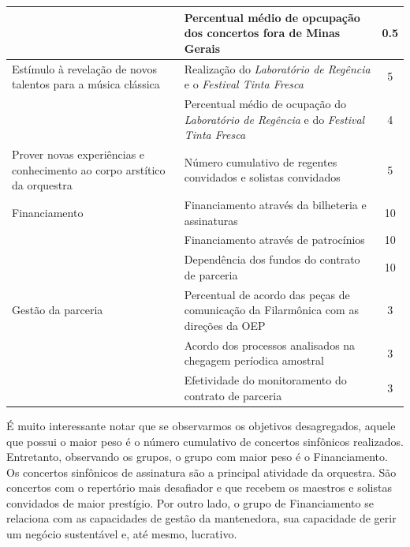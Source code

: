 \documentclass[a4paper, 12pt, openright, oneside, german, french, english, brazil]{abntex2}
\begin{document}
\begin{table}[!h]
{\begin{tabular}{p{6cm} p{7cm} c}
				& Percentual médio de opcupação dos concertos fora de Minas Gerais & 0.5 \\
				\hline
				Estímulo à revelação de novos talentos para a música clássica & Realização do \textit{Laboratório de Regência} e o \textit{Festival Tinta Fresca} & 5 \\
				& Percentual médio de ocupação do \textit{Laboratório de Regência} e do \textit{Festival Tinta Fresca} & 4 \\
				\hline
				Prover novas experiências e conhecimento ao corpo arstítico da orquestra & Número cumulativo de regentes convidados e solistas convidados & 5 \\
				\hline
				Financiamento & Financiamento através da bilheteria e assinaturas & 10 \\
				& Financiamento através de patrocínios & 10 \\
				& Dependência dos fundos do contrato de parceria & 10 \\
				\hline
				Gestão da parceria & Percentual de acordo das peças de comunicação da Filarmônica com as direções da OEP & 3 \\
				& Acordo dos processos analisados na chegagem períodica amostral & 3 \\
				& Efetividade do monitoramento do contrato de parceria & 3 \\
				\hline
				
			\end{tabular}
		}
		{}
	\end{table}
	
	
	
	É muito interessante notar que se observarmos os objetivos desagregados, aquele que possui o maior peso é o número cumulativo de concertos sinfônicos realizados. Entretanto, observando os grupos, o grupo com maior peso é o Financiamento. Os concertos sinfônicos de assinatura são a principal atividade da orquestra. São concertos com o repertório mais desafiador e que recebem os maestros e solistas convidados de maior prestígio. Por outro lado, o grupo de Financiamento se relaciona com as capacidades de gestão da mantenedora, sua capacidade de gerir um negócio sustentável e, até mesmo, lucrativo.
	
\end{document}
